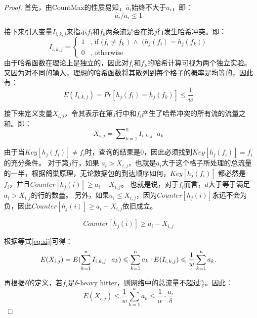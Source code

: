 \begin{proof}
首先，由CountMax的性质易知，$\hat{a}_i$始终不大于$a_i$，即：
\begin{equation}
    \hat{a}_i/{a_i} \le 1
\end{equation}

接下来引入变量$I_{i,k,j}$来指示$f_i$和$f_k$两条流是否在第$j$行发生哈希冲突。即：
\begin{equation}
    I_{i,k,j}=\left\{
    \begin{aligned}
    1&\text{, if ($f_i \ne f_k $ ) $\land $ ($h_j(f_i)=h_j(f_k)$)}\\
    0&\text{, otherwise}
    \end{aligned}
    \right.
\end{equation}
由于哈希函数在理论上是独立的，因此对$f_i$和$f_k$的哈希计算可视为两个独立实验。又因为对不同的输入，理想的哈希函数将其散列到每个格子的概率是均等的，因此有：
\begin{equation}
    E(I_{i,k,j})=Pr[h_j(f_i)=h_j(f_k)]\le \frac{1}{w}
\end{equation}

接下来定义变量$X_{i,j}$，令其表示在第$j$行中和$f_i$产生了哈希冲突的所有流的流量之和。即：
\begin{equation}\label{eq:xij}
    X_{i,j}=\sum\nolimits_{k=1}^{n}I_{i,k,j}\cdot a_k
\end{equation}

由于当$Key[h_j(f_i)]\ne f_i$时，查询的结果是0，因此必须找到$Key[h_j(f_i)] = f_i$的充分条件。
对于第$j$行，如果 $a_i > X_{i,j}$，也就是$a_i$大于这个格子所处理的总流量的一半，根据鸽巢原理，无论数据包的到达顺序如何，$Key[h_j(f_i)]$ 都必然是 $f_i$，并且$Counter[h_j(i)]\ge a_i-X_{i,j}$。
也就是说，对于$f_i$而言，$\tilde{d}$大于等于满足$a_i > X_{i,j}$的行的数量。
另外，如果$a_i \le X_{i,j}$，因为$Counter[h_j(i)]$永远不会为负，因此$Counter[h_j(i)]\ge a_i-X_{i,j}$依旧成立。

\begin{equation}\label{eq:ai_xij}
    Counter[h_j(i)]\ge a_i-X_{i,j}
\end{equation}

根据等式\eqref{eq:xij}可得：
\begin{equation}\label{eq:ex}\notag
E(X_{i,j})=E(\sum_{k=1}^{n}I_{i,k,j}\cdot a_k)\le\sum_{k=1}^{n} a_k\cdot E(I_{i,k,j})\le \frac{1}{w}\sum_{k=1}^{n}a_k.
\end{equation}


再根据$\delta$的定义，若$f_i$是$\delta$-heavy hitter，则网络中的总流量不超过$\frac{a_i}{\delta}$。因此：
\begin{equation}\label{eq:ex-delta}
E(X_{i,j})\le \frac{1}{w}\sum_{k=1}^{n}a_k\le \frac{1}{w}\cdot \frac{a_i}{\delta}
\end{equation}


\end{proof}
